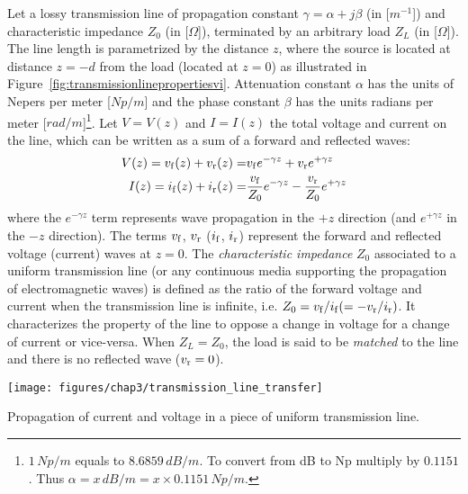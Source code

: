 Let a lossy transmission line of propagation constant $\gamma=\alpha+j\beta$ (in [$\si{m^{-1}}$]) and characteristic impedance $Z_0$ (in [$\si{\Omega}$]), terminated by an arbitrary load $Z_L$ (in [$\si{\Omega}$]). The line length is parametrized by the distance $z$, where the source is located at distance $z=-d$ from the load (located at $z=0$) as illustrated in Figure~\ref{fig:transmissionlinepropertiesvi}. Attenuation constant $\alpha$ has the units of Nepers per meter [$\si{Np/m}$] and the phase constant $\beta$ has the units radians per meter [$\si{rad/m}$]\footnote{$1\,\si{Np/m}$ equals to $8.6859 \, \si{dB/m}$. To convert from \si{dB} to \si{Np} multiply by $0.1151$. Thus $\alpha = x \, \si{dB/m} = x \times 0.1151 \, \si{Np/m}$.}. Let $V=V(z)$ and $I=I(z)$ the total voltage and current on the line, which can be written as a sum of a forward and reflected waves:
\begin{subequations}
\begin{align}
	V(z) = {v_{\mathrm{f}}}(z) + {v_{\mathrm{r}}}(z) =& {v_{\mathrm{f}}} e^{-\gamma z} + {v_{\mathrm{r}}} e^{+\gamma z} \\
	I(z) = {i_{\mathrm{f}}}(z) + {i_{\mathrm{r}}}(z) =& \frac{{v_{\mathrm{f}}}}{Z_0} e^{-\gamma z} - \frac{{v_{\mathrm{r}}}}{Z_0} e^{+\gamma z}
\end{align}
	\label{eq:voltage_current_lossy_line}
\end{subequations}
where the $e^{-\gamma z}$ term represents wave propagation in the $+z$ direction (and $e^{+\gamma z}$ in the $-z$ direction). The terms ${v_{\mathrm{f}}}$, ${v_{\mathrm{r}}}$ (${i_{\mathrm{f}}}$, ${i_{\mathrm{r}}}$) represent the forward and reflected voltage (current) waves at $z=0$.  
The \textit{characteristic impedance} $Z_0$ associated to a uniform transmission line (or any continuous media supporting the propagation of electromagnetic waves) is defined as the ratio of the forward voltage and current when the transmission line is infinite, i.e.  $Z_0={v_{\mathrm{f}}}/{i_{\mathrm{f}}}(=-{v_{\mathrm{r}}}/{i_{\mathrm{r}}})$. It characterizes the property of the line to oppose a change in voltage for a change of current or vice-versa. When $Z_L=Z_0$, the load is said to be \textit{matched} to the line and there is no reflected wave (${v_{\mathrm{r}}}=0$).

\begin{marginfigure}[-2cm]
	\texttt{[image: figures/chap3/transmission\_line\_transfer]}
	\caption{Propagation of current and voltage in a piece of uniform transmission line.}
	\label{fig:transmission_line_transfer}
\end{marginfigure}

